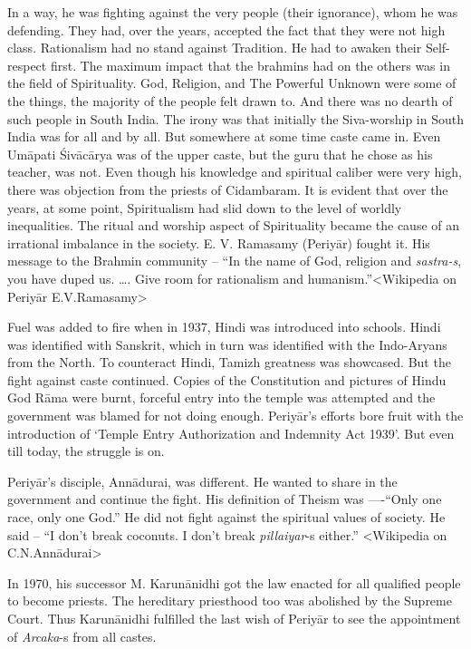 In a way, he was fighting against the very people (their ignorance), whom he was defending. They had, over the years, accepted the fact that they were not high class. Rationalism had no stand against Tradition. He had to awaken their Self-respect first. The maximum impact that the brahmins had on the others was in the field of Spirituality. God, Religion, and The Powerful Unknown were some of the things, the majority of the people felt drawn to. And there was no dearth of such people in South India. The irony was that initially the Siva-worship in South India was for all and by all. But somewhere at some time caste came in. Even Umāpati Śivācārya was of the upper caste, but the guru that he chose as his teacher, was not. Even though his knowledge and spiritual caliber were very high, there was objection from the priests of Cidambaram. It is evident that over the years, at some point, Spiritualism had slid down to the level of worldly inequalities. The ritual and worship aspect of Spirituality became the cause of an irrational imbalance in the society. E. V. Ramasamy (Periyār) fought it. His message to the Brahmin community – “In the name of God, religion and \textit{sastra-s}, you have duped us. …. Give room for rationalism and humanism.”\textless Wikipedia on Periyār E.V.Ramasamy\textgreater 

Fuel was added to fire when in 1937, Hindi was introduced into schools. Hindi was identified with Sanskrit, which in turn was identified with the Indo-Aryans from the North. To counteract Hindi, Tamizh greatness was showcased. But the fight against caste continued. Copies of the Constitution and pictures of Hindu God Rāma were burnt, forceful entry into the temple was attempted and the government was blamed for not doing enough. Periyār’s efforts bore fruit with the introduction of ‘Temple Entry Authorization and Indemnity Act 1939’. But even till today, the struggle is on.

Periyār’s disciple, Annādurai, was different. He wanted to share in the government and continue the fight. His definition of Theism was ----“Only one race, only one God.” He did not fight against the spiritual values of society. He said – “I don’t break coconuts. I don’t break \textit{pillaiyar}-s either.” \textless Wikipedia on C.N.Annādurai\textgreater 

In 1970, his successor M. Karunānidhi got the law enacted for all qualified people to become priests. The hereditary priesthood too was abolished by the Supreme Court. Thus Karunānidhi fulfilled the last wish of Periyār to see the appointment of \textit{Arcaka}-s from all castes.

